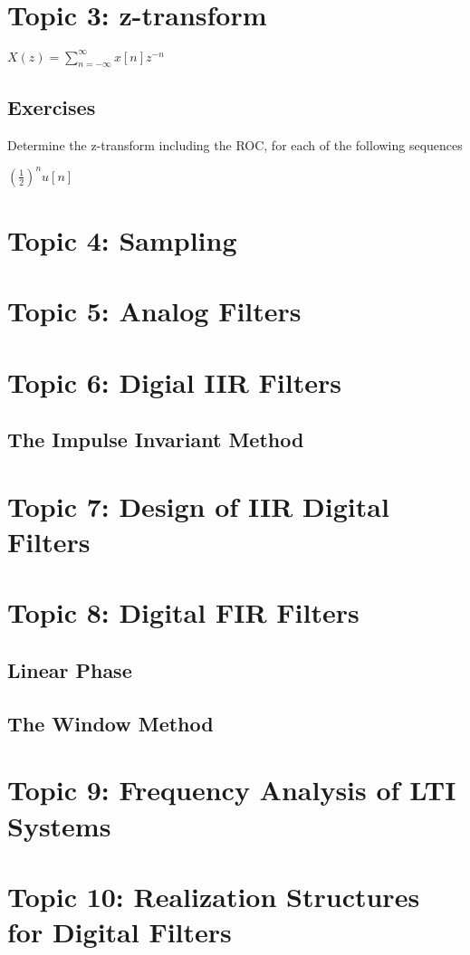 \documentclass{article}
\begin{document}
\section*{Topic 3: z-transform}
$X(z)=\sum_{n=-\infty}^{\infty}x[n]z^{-n}$

\subsection*{Exercises}
Determine the z-transform including the ROC, for each of the following sequences

\begin{enum}
	\item $(\frac12)^nu[n]$
	
\end{enum}
\section*{Topic 4: Sampling}
\section*{Topic 5: Analog Filters}
\section*{Topic 6: Digial IIR Filters}
\subsection*{The Impulse Invariant Method}
\section*{Topic 7: Design of IIR Digital Filters}
\section*{Topic 8: Digital FIR Filters}
\subsection*{Linear Phase}
\subsection*{The Window Method}
\section*{Topic 9: Frequency Analysis of LTI Systems}
\section*{Topic 10: Realization Structures for Digital Filters}
\end{document}
